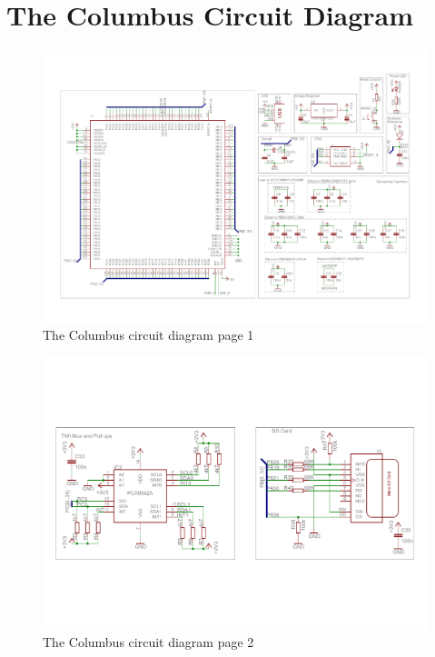 \section{The Columbus Circuit Diagram} \label{sch:Columbus:CircuitDiagram}
\begin{figure}
\centering
\includegraphics[width=\textheight,height=\textwidth,keepaspectratio]{./Figures/ColumbusCircuitPage1.pdf}
\caption{The Columbus circuit diagram page 1}
\label{sch:Columbus_Schematic:1}
\end{figure}

\begin{figure}
\centering
\includegraphics[width=\textheight,keepaspectratio]{./Figures/ColumbusCircuitPage2.pdf}
\caption{The Columbus circuit diagram page 2}
\label{sch:Columbus_Schematic:2}
\end{figure}

